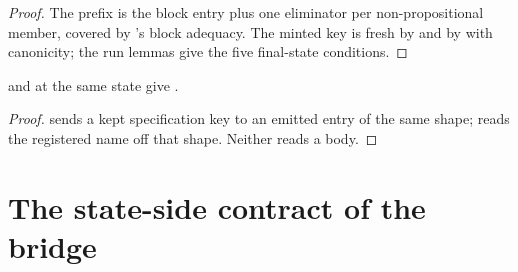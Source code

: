 \begin{proof}
\leanok
{}
 The prefix is the block entry plus one eliminator per non-propositional member, covered by
's block adequacy. The minted key is fresh by  and by
 with canonicity; the run lemmas give the five final-state conditions.
\end{proof}
\begin{lemma}
\label{lem:regSaturated_of_regKeyed}
\leanok
{}
  and  at the same state give .
\end{lemma}
\begin{proof}
\leanok
{}
  sends a kept specification key to an emitted entry of the same shape;
 reads the registered name off that shape. Neither reads a body.
\end{proof}

\section{The state-side contract of the bridge}
\label{sec:coldstart:bridgeinv}

